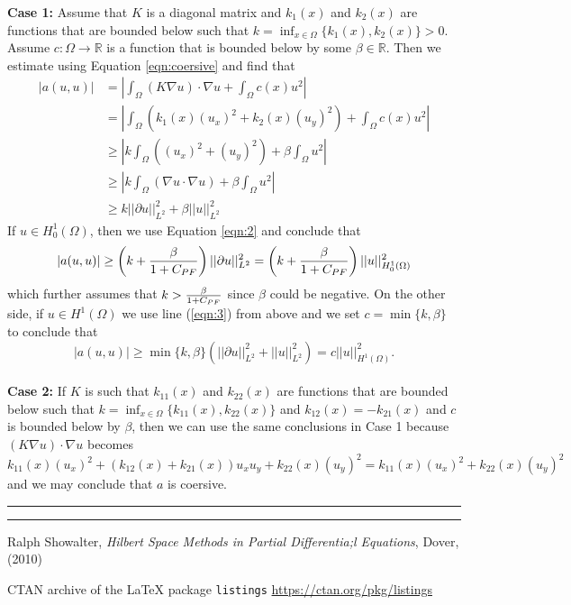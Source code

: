 \documentclass[12pt]{amsart}
\newcommand{\R}{\mathbb{R}}
\begin{document}
\noindent \textbf{Case 1:} Assume that $K$ is a diagonal matrix and $k_1(x)$ and $k_2(x)$ are functions that are bounded below such that $k = \inf_{x\in\Omega}\{k_1(x),k_2(x)\}>0$.%
 Assume $c:\Omega\to\R$ is a function that is bounded below by some $\beta\in\R$. Then we estimate using Equation \ref{eqn:coersive} and find that
\begin{align}
	|a(u,u)| & = \left| \int_\Omega (K\nabla u)\cdot \nabla u + \int_\Omega c(x) u^2 \right|\nonumber\\
		    & = \left| \int_\Omega \left(k_1(x) (u_x)^2 + k_2(x)(u_y)^2\right) + \int_\Omega c(x) u^2 \right|\nonumber\\
		    & \geq  \left| k \int_\Omega \left((u_x)^2 + (u_y)^2\right) + \beta \int_\Omega u^2 \right|\nonumber\\
		    & \geq \left| k \int_\Omega \left(\nabla u\cdot\nabla u\right) + \beta \int_\Omega u^2 \right|\nonumber\\
		    & \geq k ||\partial u||_{L^2}^2 + \beta || u||_{L^2}^2\label{eqn:3}
\end{align}
If $u\in H_0^1(\Omega)$, then we use Equation \ref{eqn:2} and conclude that 
	\[|a(u,u) |\geq \left(k + \frac{\beta}{1 + C_{\tiny PF}} \right) ||\partial u||_{L^2}^2 
				= \left(k + \frac{\beta}{1 + C_{\tiny PF}} \right)|| u||_{H_0^1(\Omega)}^2\]
which further assumes that $k > \frac{\beta}{1 + C_{\tiny PF}}$ since $\beta$ could be negative. On the other side, if $u\in H^1(\Omega)$ we use line (\ref{eqn:3}) from above and we set $c = \min\{k,\beta\}$ to conclude that 
\[ |a(u,u)| \geq \min\{k,\beta\}\left( ||\partial u||_{L^2}^2 + || u||_{L^2}^2\right) = c || u ||_{H^1(\Omega)}^2.\]\\

\noindent\textbf{Case 2:} If $K$ is such that $k_{11}(x)$ and $k_{22}(x)$ are functions that are bounded below such that $k = \inf_{x\in\Omega}\{k_{11}(x),k_{22}(x)\}$ and $k_{12}(x) = -k_{21}(x)$ and $c$ is bounded below by $\beta$, then we can use the same conclusions in Case 1 because $(K\nabla u)\cdot \nabla u $ becomes
 \[ k_{11}(x)(u_x)^2 + (k_{12}(x) + k_{21}(x)) u_xu_y + k_{22}(x)(u_y)^2 = k_{11}(x)(u_x)^2 + k_{22}(x)(u_y)^2\]
 and we may conclude that $a$ is coersive. 
\medskip
\hrule
\hrule
\medskip
\begin{thebibliography}{9}
 Ralph Showalter, \emph{Hilbert Space Methods in Partial Differentia;l Equations}, Dover, (2010)

 CTAN archive of the LaTeX package {\tt listings} \url{https://ctan.org/pkg/listings}
\end{thebibliography}
\end{document}

